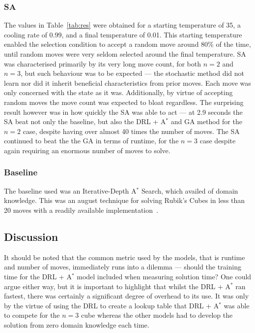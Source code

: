 \documentclass[UKenglish]{svproc}
\begin{document}
\subsubsection{SA}
The values in Table~\ref{tab:res} were obtained for a starting temperature of 35, a cooling rate of 0.99, and a final temperature of 0.01. This starting temperature enabled the selection condition to accept a random move around 80\% of the time, until random moves were very seldom selected around the final temperature.
SA was characterised primarily by its very long move count, for both $n=2$ and $n=3$, but such behaviour was to be expected --- the stochastic method did not learn nor did it inherit beneficial characteristics from prior moves. Each move was only concerned with the state as it was. Additionally, by virtue of accepting random moves the move count was expected to bloat regardless. The surprising result however was in how quickly the SA was able to act --- at 2.9 seconds the SA beat not only the baseline, but also the DRL + A$^{\ast}$ and GA method for the $n=2$ case, despite having over almost 40 times the number of moves. The SA continued to beat the the GA in terms of runtime, for the $n=3$ case despite again requiring an enormous number of moves to solve.

\subsubsection{Baseline}
The baseline used was an Iterative-Depth A$^{\ast}$ Search, which availed of domain knowledge. This was an august technique for solving Rubik's Cubes in less than 20 moves with a readily available implementation~\autocite{Shoukat2019}.

\subsection{Discussion}
It should be noted that the common metric used by the models, that is runtime and number of moves, immediately runs into a dilemma --- should the training time for the DRL + A$^{\ast}$ model included when measuring solution time?  One could argue either way, but it is important to highlight that whilst the DRL + A$^{\ast}$ ran fastest, there was certainly a significant degree of overhead to its use. It was only by the virtue of using the DRL to create a lookup table that DRL + A$^{\ast}$ was able to compete for the $n=3$ cube whereas the other models had to develop the solution from zero domain knowledge each time.
\end{document}
